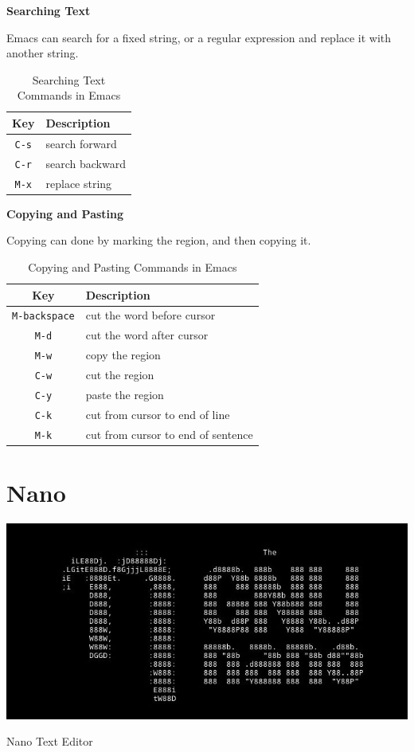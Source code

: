 \textbf{Searching Text}

Emacs can search for a fixed string, or a regular expression
and replace it with another string.

\begin{table}[h!]
  \caption{Searching Text Commands in Emacs}
  \begin{tabular}{c l}
    \toprule
    Key & Description \\
    \midrule
    \texttt{C-s} & search forward \\
    \texttt{C-r} & search backward \\
    \texttt{M-x} & replace string \\
    \bottomrule
  \end{tabular}
\end{table}

\textbf{Copying and Pasting}

Copying can done by marking the region, and then copying it.

\begin{table}[h!]
  \caption{Copying and Pasting Commands in Emacs}
  \begin{tabular}{c l}
    \toprule
    Key & Description \\
    \midrule
    \texttt{M-backspace} & cut the word before cursor \\
    \texttt{M-d} & cut the word after cursor \\
    \texttt{M-w} & copy the region \\
    \texttt{C-w} & cut the region \\
    \texttt{C-y} & paste the region \\
    \texttt{C-k} & cut from cursor to end of line \\
    \texttt{M-k} & cut from cursor to end of sentence \\
    \bottomrule
  \end{tabular}
\end{table}

\vfill
\pagebreak
\section{Nano}

\begin{marginfigure}
  \includegraphics{images/png/nano.png}
  \caption{Nano Text Editor}
\end{marginfigure}

